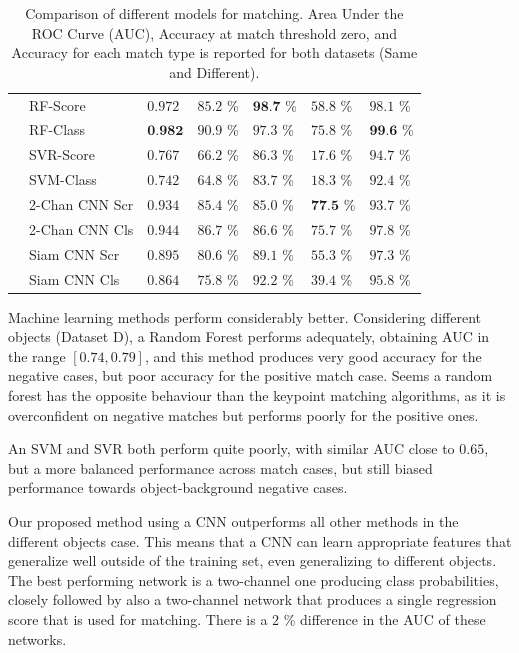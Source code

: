 \begin{table}[t]
\begin{tabular}{lllllll}
		\multirow{6}{*}{\rotatebox{90}{Same}}& RF-Score	& $0.972$	& $85.2 $ \% & $\textbf{98.7} $ \% 		&  $58.8 $ \%				&  $98.1 $ \% \\
		& RF-Class	& $\textbf{0.982}$	& $90.9 $ \% & $97.3 $ \% 		&  $75.8 $ \%				&  $\textbf{99.6} $ \% \\
		\cline{2-7}
		& SVR-Score	& $0.767$	& $66.2 $ \% & $86.3 $ \% 		&  $17.6 $ \%				&  $94.7 $ \% \\
		& SVM-Class	& $0.742$	& $64.8 $ \% & $83.7 $ \% 		&  $18.3 $ \%				&  $92.4 $ \% \\
		\cline{2-7}		
		& 2-Chan CNN Scr & $0.934$	& $85.4 $ \% & $85.0 $ \% &  $\textbf{77.5} $ \%				&  $93.7 $ \% \\
		& 2-Chan CNN Cls & $0.944$	& $86.7 $ \% & $86.6 $ \% &  $75.7 $ \%				&  $97.8 $ \% \\
		\cline{2-7}		
		& Siam CNN Scr & $0.895$	& $80.6 $ \% & $89.1 $ \% &  $55.3 $ \%				&  $97.3 $ \% \\
		& Siam CNN Cls & $0.864$	& $75.8 $ \% & $92.2 $ \% &  $39.4 $ \%				&  $95.8 $ \% \\
		\hline
	\end{tabular}
	\vspace*{0.5cm}
	\caption[Comparison of different models for matching]{Comparison of different models for matching. Area Under the ROC Curve (AUC), Accuracy at match threshold zero, and Accuracy for each match type is reported for both datasets (Same and Different).}
	\label{mat:matchingResultsTable}
\end{table}

Machine learning methods perform considerably better. Considering different objects (Dataset D), a Random Forest performs adequately, obtaining AUC in the range $[0.74, 0.79]$, and this method produces very good accuracy for the negative cases, but poor accuracy for the positive match case. Seems a random forest has the opposite behaviour than the keypoint matching algorithms, as it is overconfident on negative matches but performs poorly for the positive ones.

An SVM and SVR both perform quite poorly, with similar AUC close to $0.65$, but a more balanced performance across match cases, but still biased performance towards object-background negative cases.

Our proposed method using a CNN outperforms all other methods in the different objects case. This means that a CNN can learn appropriate features that generalize well outside of the training set, even generalizing to different objects. The best performing network is a two-channel one producing class probabilities, closely followed by also a two-channel network that produces a single regression score that is used for matching. There is a $2$ \% difference in the AUC of these networks.

